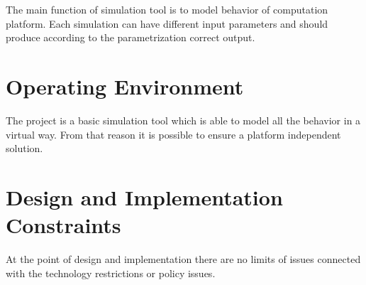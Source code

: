 \documentclass{report}
\begin{document}
The main function of simulation tool is to model behavior of computation platform. Each simulation can have different input parameters and should produce according to the parametrization correct output.


\section{Operating Environment}

The project is a basic simulation tool which is able to model all the behavior in a virtual way. From that reason it is possible to ensure a platform independent solution.

\section{Design and Implementation Constraints}

At the point of design and implementation there are no limits of issues connected with the technology restrictions or policy issues.
\end{document}
